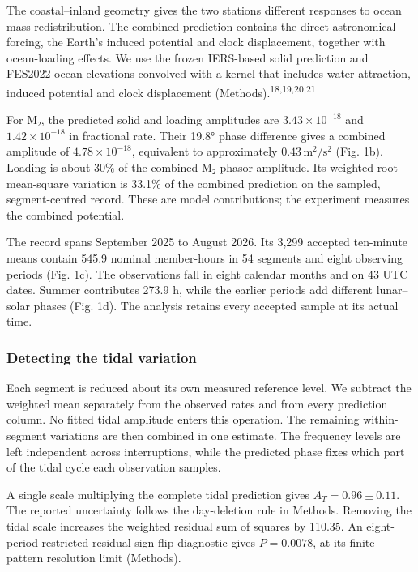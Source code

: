 \documentclass[
  12pt,
  a4paper,
]{article}
\begin{document}
The coastal--inland geometry gives the two stations different responses
to ocean mass redistribution. The combined prediction contains the
direct astronomical forcing, the Earth's induced potential and clock
displacement, together with ocean-loading effects. We use the frozen
IERS-based solid prediction and FES2022 ocean elevations convolved with
a kernel that includes water attraction, induced potential and clock
displacement (Methods).\textsuperscript{18,19,20,21}

For M₂, the predicted solid and loading amplitudes are
\(3.43\times10^{-18}\) and \(1.42\times10^{-18}\) in fractional rate.
Their 19.8° phase difference gives a combined amplitude of
\(4.78\times10^{-18}\), equivalent to approximately
\(0.43\,\mathrm{m^2/s^2}\) (Fig. 1b). Loading is about 30\% of the
combined M₂ phasor amplitude. Its weighted root-mean-square variation is
33.1\% of the combined prediction on the sampled, segment-centred
record. These are model contributions; the experiment measures the
combined potential.

The record spans September 2025 to August 2026. Its 3,299 accepted
ten-minute means contain 545.9 nominal member-hours in 54 segments and
eight observing periods (Fig. 1c). The observations fall in eight
calendar months and on 43 UTC dates. Summer contributes 273.9 h, while
the earlier periods add different lunar--solar phases (Fig. 1d). The
analysis retains every accepted sample at its actual time.

\hypertarget{detecting-the-tidal-variation}{%
\subsubsection{Detecting the tidal
variation}\label{detecting-the-tidal-variation}}

Each segment is reduced about its own measured reference level. We
subtract the weighted mean separately from the observed rates and from
every prediction column. No fitted tidal amplitude enters this
operation. The remaining within-segment variations are then combined in
one estimate. The frequency levels are left independent across
interruptions, while the predicted phase fixes which part of the tidal
cycle each observation samples.

A single scale multiplying the complete tidal prediction gives
\(A_T=0.96\pm0.11\). The reported uncertainty follows the day-deletion
rule in Methods. Removing the tidal scale increases the weighted
residual sum of squares by 110.35. An eight-period restricted residual
sign-flip diagnostic gives \(P=0.0078\), at its finite-pattern
resolution limit (Methods).
\end{document}

